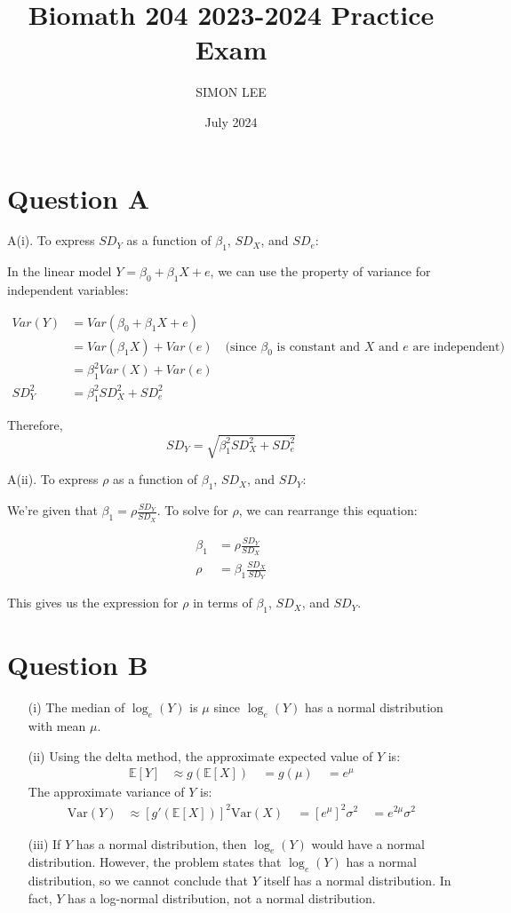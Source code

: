 \documentclass{article}
\title{Biomath 204 2023-2024 Practice Exam}
\author{SIMON LEE}
\date{July 2024}
\begin{document}
\maketitle

\section{Question A}

A(i). To express $SD_Y$ as a function of $\beta_1$, $SD_X$, and $SD_e$:

In the linear model $Y = \beta_0 + \beta_1 X + e$, we can use the property of variance for independent variables:

\begin{align*}
Var(Y) &= Var(\beta_0 + \beta_1 X + e) \\
&= Var(\beta_1 X) + Var(e) \quad \text{(since $\beta_0$ is constant and $X$ and $e$ are independent)} \\
&= \beta_1^2 Var(X) + Var(e) \\
SD_Y^2 &= \beta_1^2 SD_X^2 + SD_e^2
\end{align*}

Therefore, 
\[ SD_Y = \sqrt{\beta_1^2 SD_X^2 + SD_e^2} \]

A(ii). To express $\rho$ as a function of $\beta_1$, $SD_X$, and $SD_Y$:

We're given that $\beta_1 = \rho \frac{SD_Y}{SD_X}$. To solve for $\rho$, we can rearrange this equation:

\begin{align*}
\beta_1 &= \rho \frac{SD_Y}{SD_X} \\
\rho &= \beta_1 \frac{SD_X}{SD_Y}
\end{align*}

This gives us the expression for $\rho$ in terms of $\beta_1$, $SD_X$, and $SD_Y$.

\newpage

\section{Question B}

\begin{enumerate}
\item[(i)] The median of $\log_e(Y)$ is $\mu$ since $\log_e(Y)$ has a normal distribution with mean $\mu$.
\item[(ii)] Using the delta method, the approximate expected value of $Y$ is:
\begin{align*}
\mathbb{E}[Y] &\approx g(\mathbb{E}[X]) \
&= g(\mu) \
&= e^\mu
\end{align*}
The approximate variance of $Y$ is:
\begin{align*}
\text{Var}(Y) &\approx [g'(\mathbb{E}[X])]^2 \text{Var}(X) \
&= [e^\mu]^2 \sigma^2 \
&= e^{2\mu} \sigma^2
\end{align*}
\item[(iii)] If $Y$ has a normal distribution, then $\log_e(Y)$ would have a normal distribution. However, the problem states that $\log_e(Y)$ has a normal distribution, so we cannot conclude that $Y$ itself has a normal distribution. In fact, $Y$ has a log-normal distribution, not a normal distribution.
\end{enumerate}
\newpage
\end{document}
